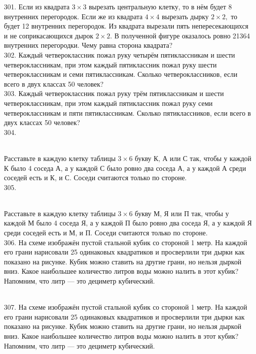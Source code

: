301. Если из квадрата $3\times3$ вырезать центральную клетку, то в нём будет 8 внутренних перегородок. Если же из квадрата $4\times4$ вырезать дырку $2\times2,$ то будет 12 внутренних перегородок. Из квадрата вырезали пять непересекающихся и не соприкасающихся дырок $2\times2.$ В полученной фигуре оказалось ровно 21364 внутренних перегородки. Чему равна сторона квадрата?\\
302. Каждый четвероклассник пожал руку четырём пятиклассникам и шести четвероклассникам, при этом каждый пятиклассник пожал руку шести четвероклассникам и семи пятиклассникам. Сколько четвероклассников, если всего в двух классах 50 человек?\\
303. Каждый четвероклассник пожал руку трём пятиклассникам и шести четвероклассникам, при этом каждый пятиклассник пожал руку семи четвероклассникам и пяти пятиклассникам. Сколько пятиклассников, если всего в двух классах 50 человек?\\
304. \begin{figure}[ht!]
\end{figure}\\
Расставьте в каждую клетку таблицы $3\times6$ букву К, А или С так, чтобы у каждой К было 4 соседа А, а у каждой С было ровно два соседа А, а у каждой А среди соседей есть и К, и С. Соседи считаются только по стороне.\\
305. \begin{figure}[ht!]
\end{figure}\\
Расставьте в каждую клетку таблицы $3\times6$ букву М, Я или П так, чтобы у каждой М было 4 соседа Я, а у каждой П было ровно два соседа Я, а у каждой Я среди соседей есть и М, и П. Соседи считаются только по стороне.\\
306. На схеме изображён пустой стальной кубик со стороной 1 метр. На каждой его грани нарисовали 25 одинаковых квадратиков и просверлили три дырки как показано на рисунке. Кубик можно ставить на другие грани, но нельзя дыркой вниз. Какое наибольшее количество литров воды можно налить в этот кубик? Напомним, что литр --- это дециметр кубический.
\begin{figure}[ht!]
\end{figure}\\
307. На схеме изображён пустой стальной кубик со стороной 1 метр. На каждой его грани нарисовали 25 одинаковых квадратиков и просверлили три дырки как показано на рисунке. Кубик можно ставить на другие грани, но нельзя дыркой вниз. Какое наибольшее количество литров воды можно налить в этот кубик? Напомним, что литр --- это дециметр кубический.
